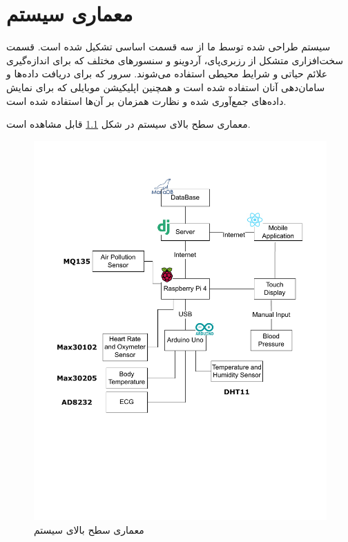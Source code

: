 \chapter{معماری سیستم}

سیستم طراحی شده توسط ما از سه قسمت اساسی تشکیل شده است. قسمت سخت‌افزاری متشکل از رزبری‌پای، آردوینو و سنسور‌های مختلف که برای اندازه‌گیری علائم حیاتی و شرایط محیطی استفاده می‌شوند. سرور که برای دریافت داده‌ها و سامان‌دهی آنان استفاده شده است و همچنین اپلیکیشن موبایلی که برای نمایش داده‌های جمع‌آوری شده و نظارت همزمان بر آن‌ها استفاده شده است.

معماری سطح بالای سیستم در شکل \ref{fig:1} قابل مشاهده است.

\begin{figure}[ht!]
\centering
		\includegraphics[scale=0.8]{figs/HWLAB.pdf}

	\caption{معماری سطح بالای سیستم}
	\label{fig:1}
\end{figure}